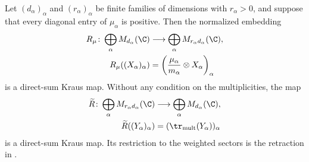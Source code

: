 \begin{lemma}
    \label{thm:mpdo_vertical_sector_partial_trace_kraus}
    \leanok
    Let $(d_\alpha)_\alpha$ and $(r_\alpha)_\alpha$ be finite families of
    dimensions with $r_\alpha>0$, and suppose that every diagonal entry of
    $\mu_\alpha$ is positive. Then the normalized embedding
    \begin{align}
        R_\mu\colon\bigoplus_\alpha M_{d_\alpha}(\C)
         & \longrightarrow \bigoplus_\alpha M_{r_\alpha d_\alpha}(\C),
        \notag                                                              \\
        R_\mu((X_\alpha)_\alpha)
         & =\left(\frac{\mu_\alpha}{m_\alpha}\otimes X_\alpha\right)_\alpha
        \notag
    \end{align}
    is a direct-sum Kraus map. Without any condition on the multiplicities,
    the map
    \begin{align}
        \widetilde R\colon\bigoplus_\alpha M_{r_\alpha d_\alpha}(\C)
         & \longrightarrow \bigoplus_\alpha M_{d_\alpha}(\C),
        \notag                                                \\
        \widetilde R((Y_\alpha)_\alpha)
         & =(\tr_{\mathrm{mult}}(Y_\alpha))_\alpha
        \notag
    \end{align}
    is a direct-sum Kraus map. Its restriction to the weighted sectors is
    the retraction in
    \cite[Appendix~C.4, lines~1961--1970]{Cirac2016MPDO_arXiv}.
\end{lemma}

